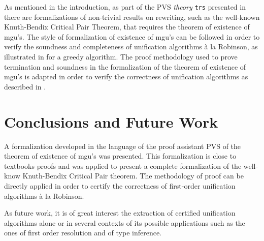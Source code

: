 \documentclass[submission,copyright,creativecommons]{eptcs}
\begin{document}
  As mentioned in the introduction, as part of the PVS \emph{theory}
  {\color{blue} \tt trs} presented in \cite{GaAR2008b} there are
  formalizations of non-trivial results on rewriting, such as the
  well-known Knuth-Bendix Critical Pair Theorem, that
  requires the theorem of existence of mgu's. The style of formalization
  of existence of mgu's can be followed in order to verify the soundness
  and completeness of unification algorithms \`{a} la Robinson, as
  illustrated in \cite{AMARG2010} for a greedy algorithm.
  The proof methodology used to prove termination and soundness in the
  formalization of the theorem of existence of mgu's is adapted in
  order to verify the correctness of unification algorithms as
  described in \cite{AMARG2010}.

  \section{Conclusions and Future Work}\label{Sec:conclusion}

  A formalization developed in the language of the proof assistant PVS
  of the theorem of existence of mgu's was presented. This
  formalization is close to textbooks proofs and was applied to
  present a complete formalization of the well-know Knuth-Bendix
  Critical Pair theorem.  The methodology of proof can be directly
  applied in order to certify the correctness of first-order
  unification algorithms \`a la Robinson.

  As future work, it is of great interest the extraction of certified
  unification algorithms alone or in several contexts of its possible
  applications such as the ones of first order resolution and of type
  inference.

  
\end{document}
